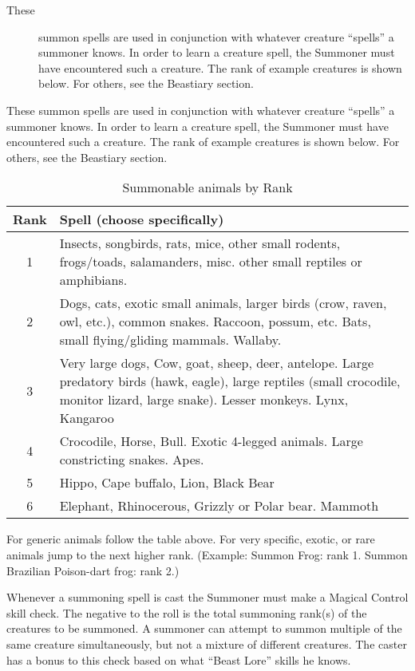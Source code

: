 \begin{description}
\item[These] summon spells are used in conjunction with whatever
  creature ``spells'' a summoner knows.  In order to learn a creature
  spell, the Summoner must have encountered such a creature.  The rank
  of example creatures is shown below.  For others, see the Beastiary
  section.
\end{description}

These summon spells are used in conjunction with whatever creature
``spells'' a summoner knows.  In order to learn a creature spell, the
Summoner must have encountered such a creature.  The rank of example
creatures is shown below.  For others, see the Beastiary section.

\begin{table}[htb]
\begin{center}
\begin{tabular}{c|p{4.5in}}
\textbf{Rank} & \textbf{Spell (choose specifically)} \\
\hline
\hline
1 & Insects, songbirds, rats, mice, other small rodents, frogs/toads, salamanders, misc. other small reptiles or amphibians. \\ \hline
2 & Dogs, cats, exotic small animals, larger birds (crow, raven, owl, etc.), common snakes.  Raccoon, possum, etc.  Bats, small flying/gliding mammals.  Wallaby. \\ \hline
3 & Very large dogs, Cow, goat, sheep, deer, antelope.  Large predatory birds (hawk, eagle), large reptiles (small crocodile, monitor lizard, large snake).  Lesser monkeys.  Lynx, Kangaroo \\ \hline
4 & Crocodile, Horse, Bull.  Exotic 4-legged animals.  Large constricting snakes.  Apes. \\ \hline
5 & Hippo, Cape buffalo, Lion, Black Bear \\ \hline
6 & Elephant, Rhinocerous, Grizzly or Polar bear.  Mammoth \\
\end{tabular}
\caption{Summonable animals by Rank}
\end{center}
\end{table}

For generic animals follow the table above.  For very specific,
exotic, or rare animals jump to the next higher rank.  (Example:
Summon Frog: rank 1.  Summon Brazilian Poison-dart frog: rank 2.)

Whenever a summoning spell is cast the Summoner must make a Magical
Control skill check.  The negative to the roll is the total summoning
rank(s) of the creatures to be summoned.  A summoner can attempt to
summon multiple of the same creature simultaneously, but not a mixture
of different creatures.  The caster has a bonus to this check based on
what ``Beast Lore'' skills he knows.

